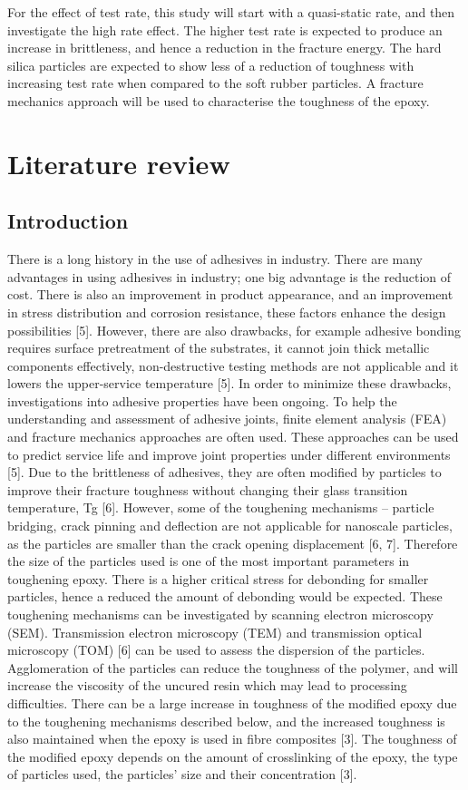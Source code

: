 \documentclass[numbers=noendperiod,chapterprefix=on]{icldt} %
\begin{document}
For the effect of test rate, this study will start with a quasi-static rate, and then investigate the high rate effect. The higher test rate is expected to produce an increase in brittleness, and hence a reduction in the fracture energy. The hard silica particles are expected to show less of a reduction of toughness with increasing test rate when compared to the soft rubber particles. A fracture mechanics approach will be used to characterise the toughness of the epoxy. 

\chapter{Literature review}
\section{Introduction}
There is a long history in the use of adhesives in industry. There are many advantages in using adhesives in industry; one big advantage is the reduction of cost. There is also an improvement in product appearance, and an improvement in stress distribution and corrosion resistance, these factors enhance the design possibilities [5]. However, there are also drawbacks, for example adhesive bonding requires surface pretreatment of the substrates, it cannot join thick metallic components effectively, non-destructive testing methods are not applicable and it lowers the upper-service temperature [5]. 
In order to minimize these drawbacks, investigations into adhesive properties have been ongoing. To help the understanding and assessment of adhesive joints, finite element analysis (FEA) and fracture mechanics approaches are often used. These approaches can be used to predict service life and improve joint properties under different environments [5]. 
Due to the brittleness of adhesives, they are often modified by particles to improve their fracture toughness without changing their glass transition temperature, Tg [6]. However, some of the toughening mechanisms – particle bridging, crack pinning and deflection are not applicable for nanoscale particles, as the particles are smaller than the crack opening displacement [6, 7]. Therefore the size of the particles used is one of the most important parameters in toughening epoxy. There is a higher critical stress for debonding for smaller particles, hence a reduced the amount of debonding would be expected. These toughening mechanisms can be investigated by scanning electron microscopy (SEM). Transmission electron microscopy (TEM) and transmission optical microscopy (TOM) [6] can be used to assess the dispersion of the particles. Agglomeration of the particles can reduce the toughness of the polymer, and will increase the viscosity of the uncured resin which may lead to processing difficulties. There can be a large increase in toughness of the modified epoxy due to the toughening mechanisms described below, and the increased toughness is also maintained when the epoxy is used in fibre composites [3]. The toughness of the modified epoxy depends on the amount of crosslinking of the epoxy, the type of particles used, the particles’ size and their concentration [3]. 
\end{document}
